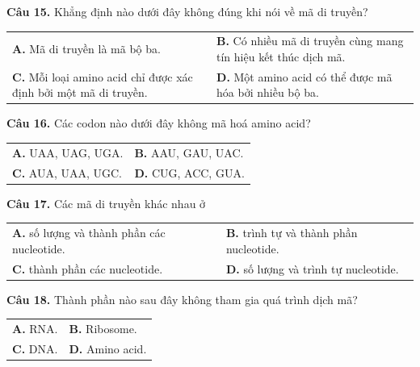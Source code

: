 \documentclass{article}
\begin{document}
\begin{minipage}[t][14.4cm][t]{\linewidth}
\fontsize{22}{29}\selectfont

\textbf{Câu 15.} Khẳng định nào dưới đây không đúng khi nói về mã di truyền?\\[4pt]
\begin{tabularx}{\linewidth}{@{}X X@{}}
\textbf{A. } Mã di truyền là mã bộ ba. & \textbf{B. } Có nhiều mã di truyền cùng mang tín hiệu kết thúc dịch mã.\\[4pt]
\textbf{C. } Mỗi loại amino acid chỉ được xác định bởi một mã di truyền. & \textbf{D. } Một amino acid có thể được mã hóa bởi nhiều bộ ba.
\end{tabularx}
\vspace*{\fill}
\textbf{Câu 16.} Các codon nào dưới đây không mã hoá amino acid?\\[4pt]
\begin{tabularx}{\linewidth}{@{}X X@{}}
\textbf{A. } UAA, UAG, UGA. & \textbf{B. } AAU, GAU, UAC.\\[4pt]
\textbf{C. } AUA, UAA, UGC. & \textbf{D. } CUG, ACC, GUA.
\end{tabularx}

\end{minipage}
\newpage


\begin{minipage}[t][14.4cm][t]{\linewidth}
\fontsize{25}{33}\selectfont

\textbf{Câu 17.} Các mã di truyền khác nhau ở\\[4pt]
\begin{tabularx}{\linewidth}{@{}X X@{}}
\textbf{A. } số lượng và thành phần các nucleotide. & \textbf{B. } trình tự và thành phần nucleotide.\\[4pt]
\textbf{C. } thành phần các nucleotide. & \textbf{D. } số lượng và trình tự nucleotide.
\end{tabularx}
\vspace*{\fill}
\textbf{Câu 18.} Thành phần nào sau đây không tham gia quá trình dịch mã?\\[4pt]
\begin{tabularx}{\linewidth}{@{}X X@{}}
\textbf{A. } RNA. & \textbf{B. } Ribosome.\\[4pt]
\textbf{C. } DNA. & \textbf{D. } Amino acid.
\end{tabularx}

\end{minipage}
\newpage
\end{document}
